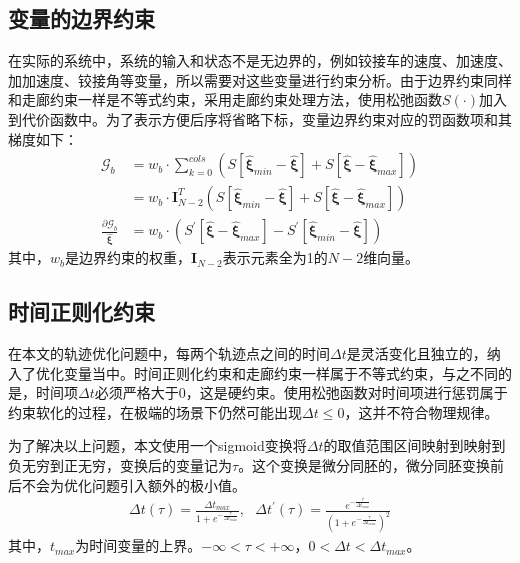 \documentclass[master,academic]{ysuthesis} %
\begin{document}
		\subsection{变量的边界约束}
		在实际的系统中，系统的输入和状态不是无边界的，例如铰接车的速度、加速度、加加速度、铰接角等变量，所以需要对这些变量进行约束分析。由于边界约束同样和走廊约束一样是不等式约束，采用走廊约束处理方法，使用松弛函数$S(\cdot)$加入到代价函数中。为了表示方便后序将省略下标，变量边界约束对应的罚函数项和其梯度如下：
		\begin{equation}
			\begin{aligned}
				\mathcal{G}_b&=w_b\cdot \sum_{k=0}^{cols}{\left( S\left[ \hat{\bm{\xi}}_{min}-\hat{\bm{\xi}} \right] +S\left[ \hat{\bm{\xi}}-\hat{\bm{\xi}}_{max} \right] \right)}\\
				&=w_b\cdot \bm{I}_{N-2}^{T}\left( S\left[ \hat{\bm{\xi}}_{min}-\hat{\bm{\xi}} \right] +S\left[ \hat{\bm{\xi}}-\hat{\bm{\xi}}_{max} \right] \right)\\
				\frac{\partial \mathcal{G}_b}{\hat{\bm{\xi}}}&=w_b\cdot \left( S^{'}\left[ \hat{\bm{\xi}}-\hat{\bm{\xi}}_{max} \right] -S^{'}\left[ \hat{\bm{\xi}}_{min}-\hat{\bm{\xi}} \right] \right)
			\end{aligned}
			\label{eq:Gb}
		\end{equation}
		其中，$w_b$是边界约束的权重，$\bm{I}_{N-2}$表示元素全为1的$N-2$维向量。

		\subsection{时间正则化约束}
		在本文的轨迹优化问题中，每两个轨迹点之间的时间$\Delta t$是灵活变化且独立的，纳入了优化变量当中。时间正则化约束和走廊约束一样属于不等式约束，与之不同的是，时间项$\Delta t$必须严格大于0，这是硬约束。使用松弛函数对时间项进行惩罚属于约束软化的过程，在极端的场景下仍然可能出现$\Delta t \le 0$，这并不符合物理规律。

		为了解决以上问题，本文使用一个sigmoid变换将$\Delta t$的取值范围区间映射到映射到负无穷到正无穷，变换后的变量记为$\tau$。这个变换是微分同胚的，微分同胚变换前后不会为优化问题引入额外的极小值。
		\begin{equation}
			\begin{aligned}
				\Delta t\left( \tau \right) =\frac{\Delta t_{max}}{1+e^{-\frac{\tau}{\Delta t_{max}}}},\,\,\,\,\Delta t^{'}\left( \tau \right) =\frac{e^{-\frac{\tau}{\Delta t_{max}}}}{\left( 1+e^{-\frac{\tau}{\Delta t_{max}}} \right) ^2}
			\end{aligned}
		\end{equation}
		其中，$t_{max}$为时间变量的上界。$-\infty <\tau <+\infty $，$0<\Delta t<\Delta t_{max}$。
		
\end{document}
